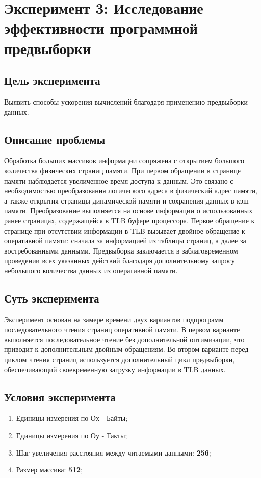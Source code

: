 \chapter{Эксперимент 3: Исследование эффективности программной предвыборки}

\section{Цель эксперимента}
Выявить способы ускорения вычислений благодаря применению предвыборки данных. 

\section{Описание проблемы}
Обработка больших массивов информации сопряжена с открытием большого количества физических страниц памяти.  При первом обращении к странице памяти наблюдается  увеличенное время доступа к данным. Это связано с необходимостью преобразования логического адреса в физический адрес памяти, а также открытия страницы динамической памяти и сохранения данных в кэш-памяти. Преобразование выполняется на основе информации о использованных ранее страницах, содержащейся в TLB буфере процессора. Первое обращение к странице при отсутствии информации  в TLB вызывает двойное обращение к оперативной памяти: сначала за информацией из таблицы страниц, а далее за востребованными данными.   Предвыборка заключается в заблаговременном проведении всех указанных действий благодаря дополнительному запросу небольшого количества данных из оперативной памяти. 

\section{Суть эксперимента}
Эксперимент основан на замере времени двух вариантов подпрограмм последовательного чтения  страниц оперативной памяти. В первом варианте выполняется последовательное чтение без дополнительной оптимизации, что приводит к дополнительным двойным обращениям. Во втором варианте перед циклом чтения страниц используется дополнительный цикл предвыборки, обеспечивающий своевременную загрузку информации в TLB данных.

\section{Условия эксперимента}
\begin{enumerate}
    \item Единицы измерения по Ох - Байты;
    \item Единицы измерения по Оу - Такты;
    \item Шаг увеличения расстояния между читаемыми данными: \textbf{256};
    \item Размер массива: \textbf{512};
\end{enumerate}

